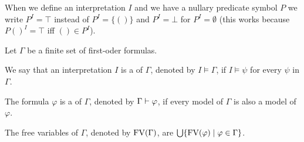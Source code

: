 When we define an interpretation $I$ and we have a nullary predicate symbol $P$ we write $P^I=\top$ instead of $P^I=\{()\}$ and $P^I=\bot$ for $P^I=\emptyset$ (this works because $P()^I=\top$ iff $()\in P^I$).
\begin{definition} %
	Let $\Gamma$ be a finite set of first-oder formulas.
	\begin{description}
		\item We say that an interpretation $I$ is a  of $\Gamma$, denoted by $I\models\Gamma$, if $I\models\psi$ for every $\psi$ in $\Gamma$.
		\item The formula $\varphi$ is a  of $\Gamma$, denoted by $\Gamma\vdash\varphi$, if every model of $\Gamma$ is also a model of $\varphi$.
		\item The free variables of $\Gamma$, denoted by $\text{FV}(\Gamma)$, are $\bigcup\{\text{FV}(\varphi)\mid \varphi\in \Gamma\}$.
	\end{description}
\end{definition}


